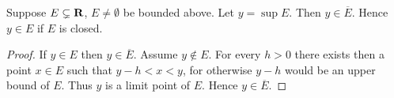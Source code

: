\begin{proposition}
Suppose $E\subsetneq\mathbf R$, $E\neq\emptyset$ be bounded above. Let $y=\sup E$. Then $y\in\overline{E}$. Hence $y\in E$ if $E$ is closed.
\end{proposition}

\begin{proof}
If $y\in E$ then $y\in\overline{E}$. Assume $y\notin E$. For every $h>0$ there exists then a point $x\in E$ such that $y-h<x<y$, for otherwise $y-h$ would be an upper bound of $E$. Thus $y$ is a limit point of $E$. Hence $y\in\overline{E}$.
\end{proof}
\pagebreak


\begin{comment}
\item A point $x$ is an \vocab{exterior point} of $A$ if it is an interior point of $A^c$.
\item $E$ is compact if it is a bounded closed set.

\begin{proposition}
The set of exterior points, $(A^c)^\circ$ is the same as $(\bar{A})^c$.
\end{proposition}

\begin{proof}
\begin{align*}
x \in (A^c)^\circ 
&\iff \exists \epsilon>0 \text{ such that } B(x,\epsilon) \subset A^c \\
&\iff B(x,\epsilon) \cap A = \emptyset \\
&\iff x \notin A \text{ and } B_0(x,\epsilon) \cap A=\emptyset \\
&\iff x \notin A \cup A^\prime = \bar A \\
&\iff x \in (\bar A^c)
\end{align*}
\end{proof}

\begin{proposition}
\begin{enumerate}[label=(\arabic*)]
\item $A^\prime$ is closed.
\item $\bar{A}$ is closed, i.e. $\bar{\bar{A}}=\bar{A}$
\end{enumerate}
\end{proposition}

\begin{proof} \
\begin{enumerate}[label=(\arabic*)]
\item In order to show that $A^\prime$ is closed, we need to show that if $x$ is a limit point of $A^\prime$, then $x\in A^\prime$, i.e. $x$ is a limit point of $A$.


\end{comment}

